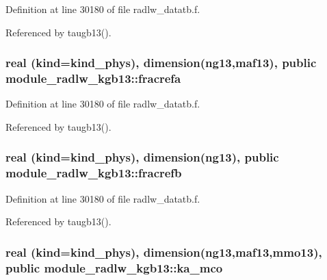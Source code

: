 Definition at line 30180 of file radlw\+\_\+datatb.\+f.



Referenced by taugb13().

\subsubsection[{\texorpdfstring{fracrefa}{fracrefa}}]{\setlength{\rightskip}{0pt plus 5cm}real (kind=kind\+\_\+phys), dimension(ng13,{\bf maf13}), public module\+\_\+radlw\+\_\+kgb13\+::fracrefa}\hypertarget{namespacemodule__radlw__kgb13_a82aed8a05cd528b287e336f7ff8fcebb}{}\label{namespacemodule__radlw__kgb13_a82aed8a05cd528b287e336f7ff8fcebb}


Definition at line 30180 of file radlw\+\_\+datatb.\+f.



Referenced by taugb13().

\subsubsection[{\texorpdfstring{fracrefb}{fracrefb}}]{\setlength{\rightskip}{0pt plus 5cm}real (kind=kind\+\_\+phys), dimension(ng13), public module\+\_\+radlw\+\_\+kgb13\+::fracrefb}\hypertarget{namespacemodule__radlw__kgb13_a92d45aee9dab62549ea8821eae7422dd}{}\label{namespacemodule__radlw__kgb13_a92d45aee9dab62549ea8821eae7422dd}


Definition at line 30180 of file radlw\+\_\+datatb.\+f.



Referenced by taugb13().

\subsubsection[{\texorpdfstring{ka\+\_\+mco}{ka_mco}}]{\setlength{\rightskip}{0pt plus 5cm}real (kind=kind\+\_\+phys), dimension(ng13,{\bf maf13},{\bf mmo13}), public module\+\_\+radlw\+\_\+kgb13\+::ka\+\_\+mco}\hypertarget{namespacemodule__radlw__kgb13_a0c2f5802f9471c35759cb673dbc8ca05}{}\label{namespacemodule__radlw__kgb13_a0c2f5802f9471c35759cb673dbc8ca05}


